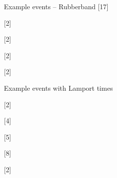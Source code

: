 \documentclass[tikz]{standalone}
\begin{document}
 \begin{msc}{Example events -- Rubberband}
     \nextlevel[1] 
     [17]
     \nextlevel[1] 
     
     \nextlevel 
     [2]
     \nextlevel[2] 
     
     \nextlevel[2] 

     \nextlevel 
     [2]
     \nextlevel[2] 

     \nextlevel[2] 

     \nextlevel[1] 
     [2]
     \nextlevel[2] 


     \nextlevel[3]
     
     \nextlevel[3] 
     
     
     \nextlevel[1] 
     [2]
     \nextlevel[2] 
     

     \nextlevel[2]

   \end{msc}
  


 \begin{msc}{Example events with Lamport times}
     
     \nextlevel 
     [2]
     \nextlevel[2] 
     
     \nextlevel[1] 
     [4]
     \nextlevel[1] 

     \nextlevel 
     [5]
     \nextlevel[2] 
     
     \nextlevel[3] 
     
     \nextlevel[2] 
     
     \nextlevel[1] 
     [8]
     \nextlevel[2] 
     
     \nextlevel[1] 
     [2]
     \nextlevel[2] 

     \nextlevel[3]

     \nextlevel[2]

   \end{msc}
  
\end{document}

